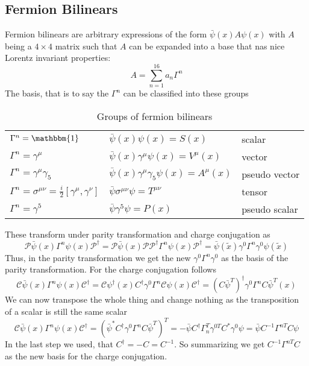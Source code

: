\documentclass{include/thesisclass}
\newcommand{\ehm}{\mathbbm{1}}
\begin{document}
\subsection{Fermion Bilinears}
Fermion bilinears are arbitrary expressions of the form $\bar \psi(x) A \psi(x)$ with $A$ being a $4 \times 4$ matrix such that $A$ can be expanded into a base that nas nice Lorentz invariant properties:
\[A = \sum_{n= 1}^{16} a_n \Gamma^n\]
The basis, that is to say the $\Gamma^n$ can be classified into these groups
\begin{table}[H]
\centering
\begin{tabular}{lll}
$\Gamma^n = \ehm$ & $\bar \psi(x) \psi(x) = S(x)$ & scalar\\
$\Gamma^n = \gamma^\mu$ & $\bar\psi(x) \gamma^\mu \psi(x) = V^\mu(x)$ & vector\\
$\Gamma^n = \gamma^\mu \gamma_5$&$\bar\psi(x) \gamma^\mu \gamma_5 \psi(x) = A^\mu(x)$ & pseudo vector\\
$\Gamma^n = \sigma^{\mu\nu} = \frac{i}{2} [\gamma^\mu, \gamma^\nu]$&$ \bar\psi \sigma^{\mu\nu} \psi = T^{\mu\nu}$& tensor\\
$\Gamma^n = \gamma^5$&$\bar \psi \gamma^5 \psi = P(x)$& pseudo scalar\\
\end{tabular}
\caption{Groups of fermion bilinears}
\end{table}
These transform under parity transformation and charge conjugation as
\[ \mathcal{P} \bar \psi (x) \Gamma^n \psi(x) \mathcal{P}^\dagger = \mathcal{P} \bar \psi(x)  \mathcal{P}\mathcal{P}^\dagger \Gamma^n \psi(x) \mathcal{P}^\dagger = \bar \psi(\tilde x) \gamma^0 \Gamma^n \gamma^0 \psi(\tilde x)\]
Thus, in the parity transformation we get the new $\gamma^0 \Gamma^n \gamma^0$ as the basis of the parity transformation. For the charge conjugation follows
\[ \mathcal{C} \bar \psi(x) \Gamma^n \psi(x) \mathcal{C}^\dagger = \mathcal C \psi^\dagger(x) C^\dagger \gamma^0 \Gamma^n \mathcal C \psi(x) \mathcal C ^\dagger = ( C \bar \psi^T)^\dagger \gamma^0 \Gamma^n C \bar \psi^T (x)\]
We can now transpose the whole thing and change nothing as the transposition of a scalar is still the same scalar
\[ \mathcal{C} \bar \psi(x) \Gamma^n \psi(x) \mathcal{C}^\dagger = ( \bar \psi ^* C^\dagger \gamma^0 \Gamma^n C \bar \psi ^T )^T = - \bar \psi C^\dagger \Gamma_n^T \gamma^{0T}C^* \gamma^0 \psi = \bar \psi C^{-1} \Gamma^{nT} C \psi\]
In the last step we used, that $C^\dagger = - C = C^{-1}$. So summarizing we get $C^{-1}\Gamma^{nT}C$ as the new basis for the charge conjugation.
\end{document}
